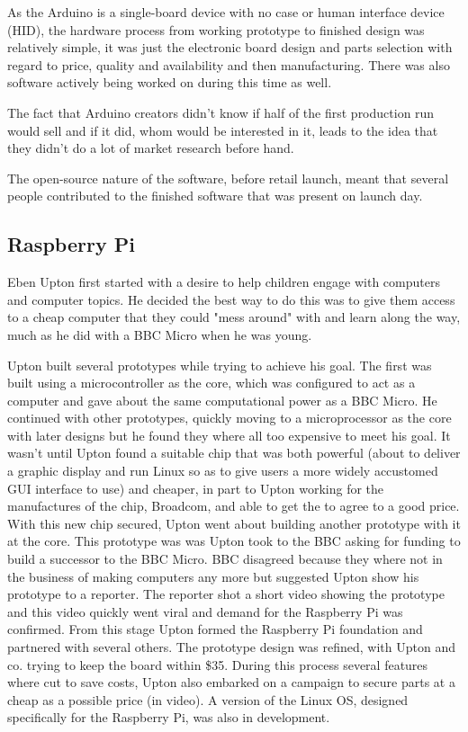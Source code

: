 As the Arduino is a single-board device with no case or human interface device (HID), the  hardware process from working prototype to finished design was relatively simple, it was just the electronic board design and parts selection with regard to price, quality and availability and then manufacturing. There was also software actively being worked on during this time as well.

The fact that Arduino creators didn't know if half of the first production run would sell and if it did, whom would be interested in it, leads to the idea that they didn't do a lot of market research before hand.

The open-source nature of the software, before retail launch, meant that several people contributed to the finished software that was present on launch day.

\subsection{Raspberry Pi}
Eben Upton first started with a desire to help children engage with computers and computer topics. He decided the best way to do this was to give them access to a cheap computer that they could "mess around" with and learn along the way, much as he did with a BBC Micro when he was young. 

Upton built several prototypes while trying to achieve his goal. The first was built using a microcontroller as the core, which was configured to act as a computer and gave about the same computational power as a BBC Micro. He continued with other prototypes, quickly moving to a microprocessor as the core with later designs but he found they where all too expensive to meet his goal. It wasn't until Upton found a suitable chip that was both powerful (about to deliver a graphic display and run Linux so as to give users a more widely accustomed GUI interface to use) and cheaper, in part to Upton working for the manufactures of the chip, Broadcom, and able to get the to agree to a good price. With this new chip secured, Upton went about building another prototype with it at the core. This prototype was was Upton took to the BBC asking for funding to build a successor to the BBC Micro. BBC disagreed because they where not in the business of making computers any more but suggested Upton show his prototype to a reporter. The reporter shot a short video showing the prototype and this video quickly went viral and demand for the Raspberry Pi was confirmed. From this stage Upton formed the Raspberry Pi foundation and partnered with several others. The prototype design was refined, with Upton and co. trying to keep the board within \$35. During this process several features where cut to save costs, Upton also embarked on a campaign to secure parts at a cheap as a possible price (in video). A version of the Linux OS, designed specifically for the Raspberry Pi, was also in development.

